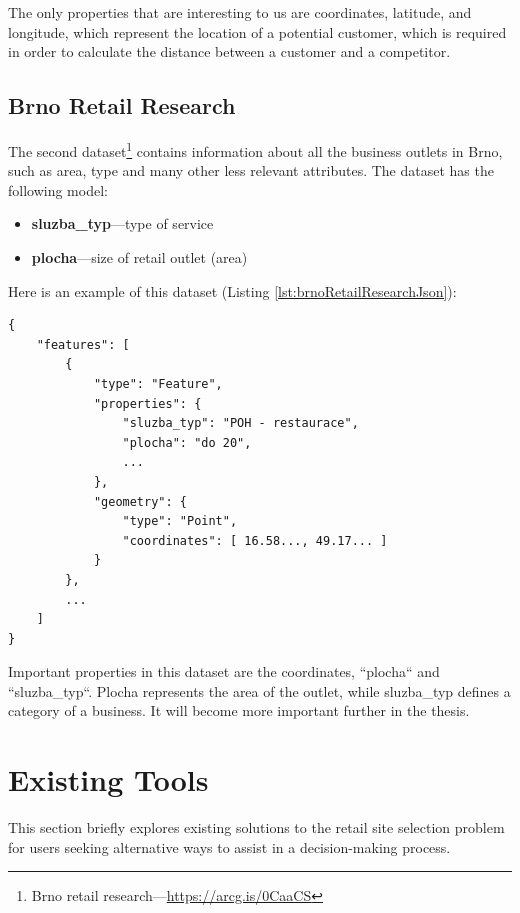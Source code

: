 The only properties that are interesting to us are coordinates, latitude, and longitude, which represent the location of a potential customer, which is required in order to calculate the distance between a customer and a competitor.

\subsection{Brno Retail Research}

The second dataset\footnote{Brno retail research---\url{https://arcg.is/0CaaCS}} contains information about all the business outlets in Brno, such as area, type and many other less relevant attributes. The dataset has the following model:

\begin{itemize}
    \item \textbf{sluzba\_typ}---type of service
    \item \textbf{plocha}---size of retail outlet (area)
\end{itemize}

Here is an example of this dataset (Listing \ref{lst:brnoRetailResearchJson}):

\begin{lstlisting}[caption={Example of a ``Brno Retail Research`` dataset.}, label=lst:brnoRetailResearchJson]
{
    "features": [
        {
            "type": "Feature",
            "properties": {
                "sluzba_typ": "POH - restaurace",
                "plocha": "do 20",
                ...
            },
            "geometry": {
                "type": "Point",
                "coordinates": [ 16.58..., 49.17... ] 
            }
        },
        ...
    ]
}
\end{lstlisting}

Important properties in this dataset are the coordinates, ``plocha`` and ``sluzba\_typ``. Plocha represents the area of the outlet, while sluzba\_typ defines a category of a business. It will become more important further in the thesis.

\section{Existing Tools}
\label{analysis:existing-tools}

This section briefly explores existing solutions to the retail site selection problem for users seeking alternative ways to assist in a decision-making process. 

